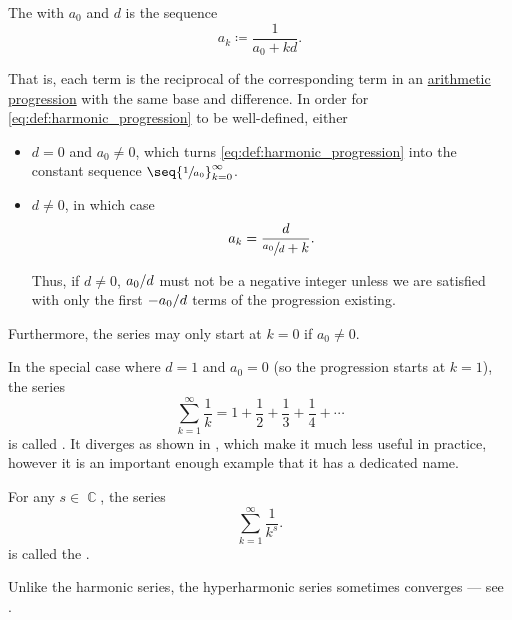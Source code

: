 \begin{definition}\label{def:harmonic_progression}
  The  with  \( a_0 \) and  \( d \) is the sequence
  \begin{equation}\label{eq:def:harmonic_progression}
    a_k \coloneqq \frac 1 {a_0 + kd}.
  \end{equation}

  That is, each term is the reciprocal of the corresponding term in an \hyperref[def:arithmetic_progression]{arithmetic progression} with the same base and difference. In order for \eqref{eq:def:harmonic_progression} to be well-defined, either
  \begin{itemize}
    \item \( d = 0 \) and \( a_0 \neq 0 \), which turns \eqref{eq:def:harmonic_progression} into the constant sequence \( \seq{ \sfrac 1 {a_0} }_{k=0}^\infty \).
    \item \( d \neq 0 \), in which case
    \begin{equation*}
      a_k = \frac d {\sfrac {a_0} d + k}.
    \end{equation*}

    Thus, if \( d \neq 0 \), \( a_0 / d \) must not be a negative integer unless we are satisfied with only the first \( -a_0 / d \) terms of the progression existing.
  \end{itemize}

  Furthermore, the series may only start at \( k = 0 \) if \( a_0 \neq 0 \).

  \begin{thmenum}
     In the special case where \( d = 1 \) and \( a_0 = 0 \) (so the progression starts at \( k = 1 \)), the series
    \begin{equation}\label{eq:def:harmonic_progression/harmonic_series}
      \sum_{k=1}^\infty \frac 1 k = 1 + \frac 1 2 + \frac 1 3 + \frac 1 4 + \cdots
    \end{equation}
    is called  . It diverges as shown in , which make it much less useful in practice, however it is an important enough example that it has a dedicated name.

     For any \( s \in \BbbC \), the series
    \begin{equation}\label{eq:def:harmonic_progression/hyperharmonic_series}
      \sum_{k=1}^\infty \frac 1 {k^s}.
    \end{equation}
    is called the .

    Unlike the harmonic series, the hyperharmonic series sometimes converges --- see .
  \end{thmenum}
\end{definition}

